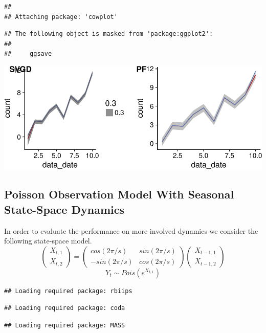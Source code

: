 \documentclass[]{article}
\begin{document}
\begin{verbatim}
## 
## Attaching package: 'cowplot'
\end{verbatim}

\begin{verbatim}
## The following object is masked from 'package:ggplot2':
## 
##     ggsave
\end{verbatim}

\includegraphics{ssvgd_files/figure-latex/unnamed-chunk-2-3.pdf}

\subsection{Poisson Observation Model With Seasonal State-Space
Dynamics}\label{poisson-observation-model-with-seasonal-state-space-dynamics}

In order to evaluate the performance on more involved dynamics we
consider the following state-space model.
\[\begin{pmatrix} X_{t,1} \\ X_{t,2} \end{pmatrix} = \begin{pmatrix} cos(2\pi/s) & sin(2\pi/s) \\ -sin(2\pi/s) & cos(2\pi/s) \end{pmatrix} \begin{pmatrix} X_{t-1,1} \\ X_{t-1,2} \end{pmatrix} \]
\[Y_t \sim Pois(e^{X_{t,1}})\]

\begin{verbatim}
## Loading required package: rbiips
\end{verbatim}

\begin{verbatim}
## Loading required package: coda
\end{verbatim}

\begin{verbatim}
## Loading required package: MASS
\end{verbatim}
\end{document}
